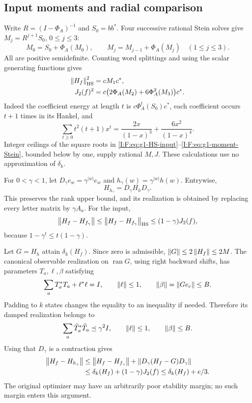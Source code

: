 \subsection{Input moments and radial comparison}

Write $R=(I-\Phi_A)^{-1}$ and $S_0=bb^*$. Four successive rational Stein
solves give $M_j=R^{j+1}S_0$, $0\le j\le3$:
\[
 M_0=S_0+\Phi_A(M_0),\qquad
 M_j=M_{j-1}+\Phi_A(M_j)\quad(1\le j\le3).
\]
All are positive semidefinite. Counting word splittings and using the scalar
generating functions gives
\begin{align}
 \left\lVert H_f\right\rVert_{\rm HS}^2&=cM_1c^*,\label{I:F:eq:g1-HS-input}\\
 J_2(f)^2&=c\bigl(2\Phi_A(M_2)+6\Phi_A^2(M_3)\bigr)c^*.
 \label{I:F:eq:g1-moment-Stein}
\end{align}
Indeed the coefficient energy at length $t$ is
$c\Phi_A^t(S_0)c^*$, each coefficient occurs $t+1$ times in its Hankel,
and
\[
 \sum_{t\ge0}t^2(t+1)x^t
 =\frac{2x}{(1-x)^3}+\frac{6x^2}{(1-x)^4}.
\]
Integer ceilings of the square roots in
\eqref{I:F:eq:g1-HS-input}--\eqref{I:F:eq:g1-moment-Stein}, bounded below by one,
supply rational $M,J$. These calculations use no approximation of
$\delta_k$.

For $0<\gamma<1$, let $D_\gamma e_w=\gamma^{|w|}e_w$ and
$h_\gamma(w)=\gamma^{|w|}h(w)$. Entrywise,
\begin{equation}
 H_{h_\gamma}=D_\gamma H_hD_\gamma.
 \label{I:F:eq:g1-radial-Hankel}
\end{equation}
This preserves the rank upper bound, and its realization is obtained by
replacing every letter matrix by $\gamma A_a$. For the input,
\begin{equation}
 \left\lVert H_f-H_{f_\gamma}\right\rVert
 \le\left\lVert H_f-H_{f_\gamma}\right\rVert_{\rm HS}
 \le(1-\gamma)J_2(f),
 \label{I:F:eq:g1-radial-bias}
\end{equation}
because $1-\gamma^t\le t(1-\gamma)$.

Let $G=H_h$ attain $\delta_k(H_f)$. Since zero is admissible,
$\left\lVert G\right\rVert\le2\left\lVert H_f\right\rVert\le2M$. The canonical observable realization on
$\operatorname{ran}G$, using right backward shifts, has parameters
$T_a,\ell,\beta$ satisfying
\[
 \sum_aT_a^*T_a+\ell^*\ell=I,
 \qquad\left\lVert\ell\right\rVert\le1,
 \qquad\left\lVert\beta\right\rVert=\left\lVert Ge_\varepsilon\right\rVert\le B.
\]
Padding to $k$ states changes the equality to an inequality if needed.
Therefore its damped realization belongs to
\begin{equation}
 \sum_a\widehat T_a^*\widehat T_a\preceq\gamma^2I,
 \qquad\left\lVert\ell\right\rVert\le1,
 \qquad\left\lVert\beta\right\rVert\le B.
 \label{I:F:eq:g1-compact-class}
\end{equation}
Using that $D_\gamma$ is a contraction gives
\begin{align}
 \left\lVert H_f-H_{h_\gamma}\right\rVert
 &\le\left\lVert H_f-H_{f_\gamma}\right\rVert
       +\left\lVert D_\gamma(H_f-G)D_\gamma\right\rVert\nonumber\\
 &\le\delta_k(H_f)+(1-\gamma)J_2(f)
 \le\delta_k(H_f)+e/3.
 \label{I:F:eq:g1-nearoptimal-damped}
\end{align}
The original optimizer may have an arbitrarily poor stability margin; no
such margin enters this argument.


